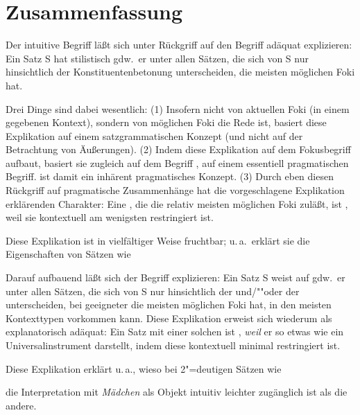 \documentclass[output=paper]{langsci/langscibook}
\begin{document}
\section{Zusammenfassung}
\label{sec:3-4}

Der intuitive Begriff  läßt sich unter
Rückgriff auf den Begriff  adäquat explizieren: Ein Satz
S hat stilistisch  gdw.\ er unter allen Sätzen,
die sich von S nur hinsichtlich der Konstituentenbetonung
unterscheiden, die meisten möglichen Foki hat.

Drei Dinge sind dabei wesentlich: (1) Insofern nicht von aktuellen
Foki (in einem gegebenen Kontext), sondern von möglichen Foki die Rede
ist, basiert diese Explikation auf einem satzgrammatischen Konzept
(und nicht auf der Betrachtung von Äußerungen). (2) Indem diese
Explikation auf dem Fokusbegriff aufbaut, basiert sie zugleich auf
dem Begriff , \dash auf einem
essentiell pragmatischen Begriff.  ist damit
ein inhärent pragmatisches Konzept. (3) Durch eben diesen Rückgriff
auf pragmatische Zusammenhänge hat die vorgeschlagene Explikation
erklärenden Charakter: Eine , die die relativ meisten
möglichen Foki zuläßt, ist , weil sie kontextuell am
wenigsten restringiert ist.

Diese Explikation ist in vielfältiger Weise fruchtbar; u.\,a.\ erklärt
sie die Eigenschaften von Sätzen wie
\begin{exe}
\end{exe}
Darauf aufbauend läßt sich der Begriff  explizieren: Ein Satz S weist  auf gdw.\ er unter allen Sätzen, die sich von
S nur hinsichtlich der  und/""oder der 
unterscheiden, bei geeigneter  die meisten möglichen Foki
hat, \dash in den meisten Kontexttypen vorkommen kann. Diese
Explikation erweist sich wiederum als explanatorisch adäquat: Ein
Satz mit einer solchen  ist , \textit{weil} er so
etwas wie ein Universalinstrument darstellt, indem diese 
kontextuell minimal restringiert ist.

Diese Explikation erklärt u.\,a., wieso bei 2"=deutigen Sätzen wie
\begin{exe}
\end{exe}
die Interpretation mit \textit{Mädchen} als Objekt intuitiv leichter zugänglich ist als die andere.
\end{document}
